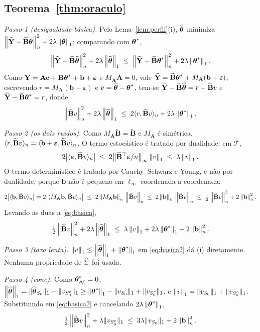 \documentclass[11pt,a4paper]{article}
\newcommand{\Amat}{\mathbf{A}}
\newcommand{\Bmat}{\mathbf{B}}
\newcommand{\Btil}{\widetilde{\Bmat}}
\newcommand{\MA}{M_{\Amat}}
\newcommand{\bveps}{\boldsymbol{\varepsilon}}
\newcommand{\bb}{\mathbf{b}}
\newcommand{\bY}{\mathbf{Y}}
\begin{document}
\subsection*{Teorema~\ref{thm:oraculo}}

\emph{Passo 1 (desigualdade básica).} Pelo Lema~\ref{lem:perfil}(i),
$\widehat{\boldsymbol{\theta}}$ minimiza $\normn{\widetilde{\bY} - \Btil\btheta}^{2} +
2\pen\norm{\btheta}_{1}$; comparando com $\boldsymbol{\theta}^{*}$,
\[
  \normn{\widetilde{\bY} - \Btil\thetahat}^{2} + 2\pen\norm{\thetahat}_{1}
  \;\le\; \normn{\widetilde{\bY} - \Btil\thetastar}^{2} + 2\pen\norm{\thetastar}_{1}.
\]
Como $\bY = \Amat\bc + \Bmat\thetastar + \bb + \bveps$ e $\MA\Amat = 0$, vale
$\widetilde{\bY} = \Btil\thetastar + \MA(\bb+\bveps)$; escrevendo
$r = \MA(\bb+\bveps)$ e $v = \widehat{\boldsymbol{\theta}} - \boldsymbol{\theta}^{*}$, tem-se
$\widetilde{\bY} - \Btil\thetahat = r - \Btil v$ e
$\widetilde{\bY} - \Btil\thetastar = r$, donde
\begin{equation}
  \label{eq:basica}
  \normn{\Btil v}^{2} + 2\pen\norm{\thetahat}_{1}
  \;\le\; 2\inner{r}{\Btil v}_{n} + 2\pen\norm{\thetastar}_{1}.
\end{equation}

\emph{Passo 2 (os dois ruídos).} Como $\MA\Btil = \Btil$ e $\MA$ é simétrica,
$\inner{r}{\Btil v}_{n} = \inner{\bb + \bveps}{\Btil v}_{n}$. O termo
estocástico é tratado por dualidade: em $\mathcal{T}$,
\[
  2\bigl|\inner{\bveps}{\Btil v}_{n}\bigr|
  \;\le\; 2\bigl\lVert\Btil\T\bveps/n\bigr\rVert_{\infty}\norm{v}_{1}
  \;\le\; \pen\norm{v}_{1}.
\]
O termo determinístico é tratado por Cauchy--Schwarz e Young, e não por
dualidade, porque $\bb$ não é pequeno em $\ell_{\infty}$ coordenada a
coordenada:
\[
  2\bigl|\inner{\bb}{\Btil v}_{n}\bigr|
  = 2\bigl|\inner{\MA\bb}{\Btil v}_{n}\bigr|
  \;\le\; 2\normn{\MA\bb}\,\normn{\Btil v}
  \;\le\; 2\normn{\bb}\,\normn{\Btil v}
  \;\le\; \tfrac12\normn{\Btil v}^{2} + 2\normn{\bb}^{2}.
\]
Levando as duas a \eqref{eq:basica},
\begin{equation}
  \label{eq:basica2}
  \tfrac12\normn{\Btil v}^{2} + 2\pen\norm{\thetahat}_{1}
  \;\le\; \pen\norm{v}_{1} + 2\pen\norm{\thetastar}_{1} + 2\normn{\bb}^{2}.
\end{equation}

\emph{Passo 3 (taxa lenta).} $\left\lVert v \right\rVert_{1} \le \left\lVert \widehat{\boldsymbol{\theta}} \right\rVert_{1} +
\left\lVert \boldsymbol{\theta}^{*} \right\rVert_{1}$ em \eqref{eq:basica2} dá (i) diretamente. Nenhuma
propriedade de $\widehat{\Sigma}$ foi usada.

\emph{Passo 4 (cone).} Como $\boldsymbol{\theta}^{*}_{S_{0}^{c}} = 0$,
$\left\lVert \widehat{\boldsymbol{\theta}} \right\rVert_{1} = \lVert\widehat{\boldsymbol{\theta}}_{S_{0}}\rVert_{1} +
\lVert v_{S_{0}^{c}}\rVert_{1} \ge \left\lVert \boldsymbol{\theta}^{*} \right\rVert_{1} -
\lVert v_{S_{0}}\rVert_{1} + \lVert v_{S_{0}^{c}}\rVert_{1}$, e
$\left\lVert v \right\rVert_{1} = \lVert v_{S_{0}}\rVert_{1} + \lVert v_{S_{0}^{c}}\rVert_{1}$.
Substituindo em \eqref{eq:basica2} e cancelando $2\lambda\left\lVert \boldsymbol{\theta}^{*} \right\rVert_{1}$,
\begin{equation}
  \label{eq:cone}
  \tfrac12\normn{\Btil v}^{2} + \pen\lVert v_{\Szero^{c}}\rVert_{1}
  \;\le\; 3\pen\lVert v_{\Szero}\rVert_{1} + 2\normn{\bb}^{2}.
\end{equation}
\end{document}
